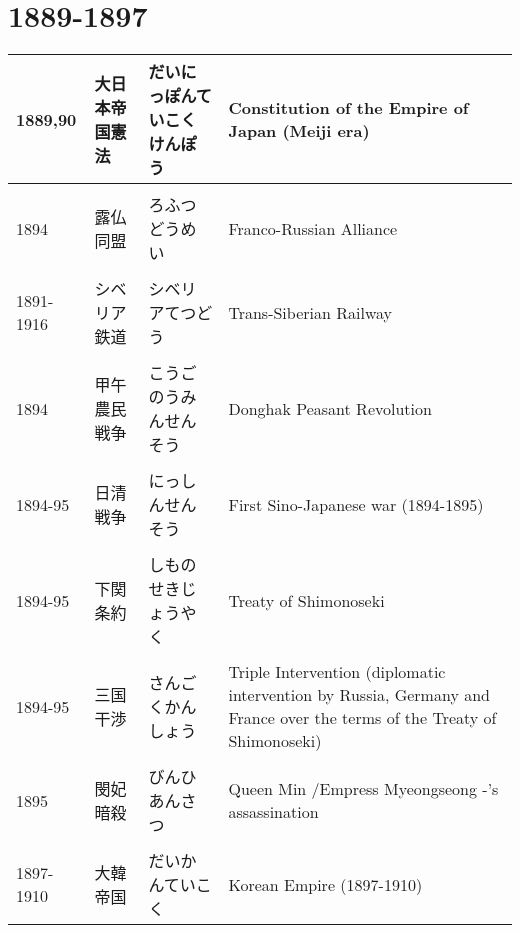 \documentclass{article}
\begin{document}
\section{1889-1897}
\begin{tabular}{p{1.8cm} |p{3.0cm} | p{4.5cm} | p{8.5cm}}
1889,90 & 大日本帝国憲法 & だいにっぽんていこくけんぽう & Constitution of the Empire of Japan (Meiji era) \\ \hline \\[-1em]
1894 & 露仏同盟 & ろふつどうめい & Franco-Russian Alliance \\ \hline \\[-1em]
1891-1916 & シベリア鉄道 & シベリアてつどう & Trans-Siberian Railway \\ \hline \\[-1em]
1894 & 甲午農民戦争 &  こうごのうみんせんそう & Donghak Peasant Revolution \\ \hline \\[-1em]
1894-95 & 日清戦争 & にっしんせんそう & First Sino-Japanese war (1894-1895) \\ \hline \\[-1em]
1894-95 & 下関条約 & しものせきじょうやく & Treaty of Shimonoseki \\ \hline \\[-1em]
1894-95 & 三国干渉 &  さんごくかんしょう & Triple Intervention (diplomatic intervention by Russia, Germany and France over the terms of the Treaty of Shimonoseki) \\ \hline \\[-1em]
1895 & 閔妃暗殺	& びんひあんさつ  & Queen Min /Empress Myeongseong -'s assassination \\ \hline \\[-1em]
1897-1910 & 大韓帝国 &  だいかんていこく & Korean Empire (1897-1910) %
\end{tabular}
\end{document}
